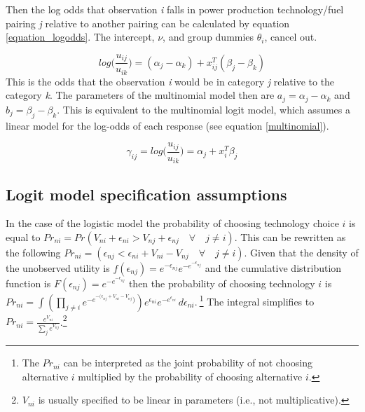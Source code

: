 \documentclass[10pt]{amsart}
\begin{document}
Then the log odds that observation \textit{i} falls in power production technology/fuel pairing \textit{j} relative to another pairing can be calculated by equation \ref{equation_logodds}.
The intercept, $\nu$, and group dummies $\theta_i$, cancel out.   

\begin{equation}\label{log_odds}
log\Big(\frac{u_{ij}}{u_{ik}}\Big) = (\alpha_j-\alpha_k) + x_{ij}^T(\beta_j - \beta_k)
\end{equation}
This is the odds that the observation \textit{i} would be in category \textit{j} relative to the category \textit{k}.
The parameters of the multinomial model then are $a_j = \alpha_j - \alpha_k$ and $b_j = \beta_j -\beta_k$. 
This is equivalent to the multinomial logit model, which assumes a linear model for the log-odds of each response (see equation \ref{multinomial}). 

\begin{equation}\label{multinomial}
\gamma_{ij} = log\Big(\frac{u_{ij}}{u_{ik}}\Big) = \alpha_j + x_i^T\beta_j
\end{equation}

\subsection{Logit model specification assumptions}
In the case of the logistic model the probability of choosing technology choice $i$ is equal to $Pr_{ni} = Pr(V_{ni} + \epsilon_{ni} > V_{nj} + \epsilon_{nj} \quad \forall \quad j \neq i)$. 
This can be rewritten as the following $Pr_{ni} = (\epsilon_{nj} <  \epsilon_{ni} + V_{ni} - V_{nj} \quad \forall \quad j \neq i)$.
Given that the density of the unobserved utility is $f(\epsilon_{nj}) = e^{-\epsilon_{nj}}e^{-e^{-\epsilon_{nj}}}$ and the cumulative distribution function is $F(\epsilon_{nj}) = e^{-e^{-\epsilon_{nj}}}$ then the probability of choosing technology $i$ is $Pr_{ni} = \int \left(\prod_{j \neq i} e^{-e^{-(\epsilon_{nj} + V_{ni} - V_{nj}})}\right)e^{\epsilon_{ni}}e^{-e^{\epsilon_{ni}}} \,d\epsilon_{ni}.\ $\footnote{The $Pr_{ni}$ can be interpreted as the joint probability of not choosing alternative $i$ multiplied by the probability of choosing alternative $i$.} 
The integral simplifies to $Pr_{ni} = \frac{e^{V_{ni}}}{\sum_{j} e^{V_{nj}}}$.\footnote{$V_{ni}$ is usually specified to be linear in parameters (i.e., not multiplicative).}
\end{document}
